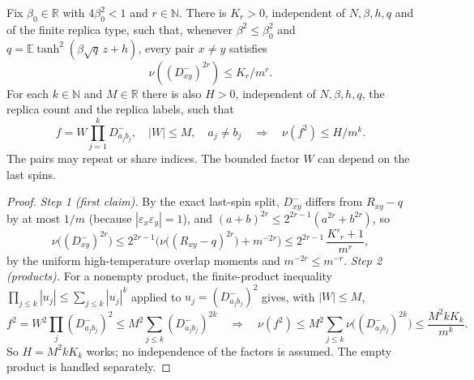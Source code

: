 \begin{lemma}\label{lem:sg-tal:cavity-higher-moments}
\leanok
{}
Fix $\beta_0\in\mathbb R$ with $4\beta_0^2<1$ and $r\in\mathbb N$.
There is $K_r>0$, independent of $N,\beta,h,q$ and of the finite replica type,
such that, whenever $\beta^2\le\beta_0^2$ and
$q=\mathbb E\tanh^2(\beta\sqrt q\,z+h)$, every pair $x\ne y$ satisfies
\[
  \nu((D^-_{xy})^{2r})\le K_r/m^r.
\]
For each $k\in\mathbb N$ and $M\in\mathbb R$ there is also $H>0$, independent
of $N,\beta,h,q$, the replica count and the replica labels, such that
\[
 f=W\prod_{j=1}^k D^-_{a_jb_j},\quad |W|\le M,\quad a_j\ne b_j
 \quad\Longrightarrow\quad \nu(f^2)\le H/m^k.
\]
The pairs may repeat or share indices. The bounded factor $W$ can depend on the last spins.
\end{lemma}
\begin{proof}
\leanok
\emph{Step 1 (first claim).} By the exact last-spin split, $D^-_{xy}$ differs from $R_{xy}-q$ by at most $1/m$ (because $|\varepsilon_x\varepsilon_y|=1$), and $(a+b)^{2r}\le2^{2r-1}(a^{2r}+b^{2r})$, so
\[
\nu\big((D^-_{xy})^{2r}\big)\le2^{2r-1}\Big(\nu\big((R_{xy}-q)^{2r}\big)+m^{-2r}\Big)\le2^{2r-1}\,\frac{K'_r+1}{m^r},
\]
by the uniform high-temperature overlap moments and $m^{-2r}\le m^{-r}$.
\emph{Step 2 (products).} For a nonempty product, the finite-product inequality $\prod_{j\le k}|u_j|\le\sum_{j\le k}|u_j|^k$ applied to $u_j=(D^-_{a_jb_j})^2$ gives, with $|W|\le M$,
\[
f^2=W^2\prod_j(D^-_{a_jb_j})^2\le M^2\sum_{j\le k}(D^-_{a_jb_j})^{2k}\quad\Longrightarrow\quad\nu(f^2)\le M^2\sum_{j\le k}\nu\big((D^-_{a_jb_j})^{2k}\big)\le\frac{M^2kK_k}{m^k}.
\]
So $H=M^2kK_k$ works; no independence of the factors is assumed. The empty product is handled separately.
\end{proof}

